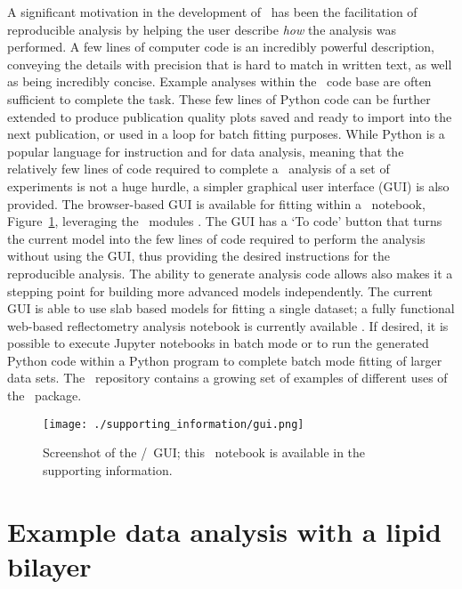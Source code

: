 \documentclass[pdf,preprint]{article}
\begin{document}
A significant motivation in the development of \ has been the facilitation of reproducible analysis by helping the user describe \emph{how} the analysis was performed. A few lines of computer code is an incredibly powerful description, conveying the details with precision that is hard to match in written text, as well as being incredibly concise.
Example analyses within the \ code base are often sufficient to complete the task.
These few lines of Python code can be further extended to produce publication quality plots saved and ready to import into the next publication, or used in a loop for batch fitting purposes.
While Python is a popular language for instruction and for data analysis, meaning that the relatively few lines of code required to complete a \ analysis of a set of experiments is not a huge hurdle, a simpler graphical user interface (GUI) is also provided.
The browser-based GUI is available for fitting within a \Jupyter\ notebook, Figure~\ref{fig:gui}, leveraging the \ipywidgets\ modules \cite{ipywidgets}. The GUI has a `To code' button that turns the current model into the few lines of code required to perform the analysis without using the GUI, thus providing the desired instructions for the reproducible analysis. The ability to generate analysis code allows also makes it a stepping point for building more advanced models independently.
The current GUI is able to use slab based models for fitting a single dataset; a fully functional web-based reflectometry analysis notebook is currently available \cite{Nelson2018}.
If desired, it is possible to execute Jupyter notebooks in batch mode or to run the generated Python code within a Python program to complete batch mode fitting of larger data sets. The \ repository contains a growing set of examples of different uses of the \ package.

\begin{figure}
  \texttt{[image: ./supporting\_information/gui.png]}
  \caption{Screenshot of the \Jupyter/\ipywidgets\ GUI; this \Jupyter\ notebook is available in the supporting information.}
  \label{fig:gui}
\end{figure}

\section{Example data analysis with a lipid bilayer}
\end{document}
